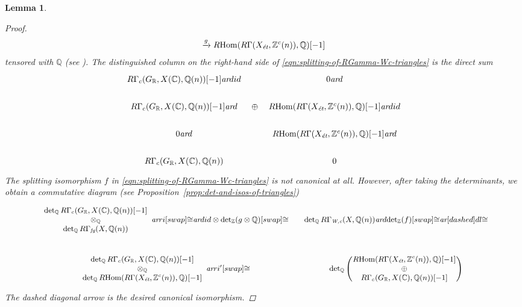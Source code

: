 \documentclass[10pt,a4paper,oneside,draft]{article}
\DeclareMathOperator{\Hom}{Hom}
\newcommand{\CC}{\mathbb{C}}
\newcommand{\QQ}{\mathbb{Q}}
\newcommand{\RR}{\mathbb{R}}
\newcommand{\ZZ}{\mathbb{Z}}
\renewcommand{\det}{\operatorname{det}}
\newcommand{\ar}{\text{\it ar}}
\newcommand{\et}{\text{\it \'{e}t}}
\newcommand{\fg}{\text{\it fg}}
\newcommand{\Wc}{\text{\it W,c}}
\newcommand{\RHom}{R\!\Hom}
\theoremstyle{myplain}
\newtheorem{lemma}[theorem]{Lemma}
\theoremstyle{mydefinition}
\numberwithin{equation}{section}
\begin{document}
\begin{lemma}
\begin{proof}
\begin{multline*}
      \xrightarrow{g} \RHom (R\Gamma (X_\et, \ZZ^c (n)), \QQ) [-1]
    \end{multline*}
    tensored with $\QQ$ (see \cite[Proposition~5.7]{Beshenov-Weil-etale-1}).
    The distinguished column on the right-hand side of
    \eqref{eqn:splitting-of-RGamma-Wc-triangles} is the direct sum
    \[ \begin{tikzcd}[row sep=1.5em]
        R\Gamma_c (G_\RR, X (\CC), \QQ (n)) [-1]\ar{d}{id} &[-2em] &[-2em] 0\ar{d} \\
        R\Gamma_c (G_\RR, X (\CC), \QQ (n)) [-1]\ar{d} & \oplus & \RHom (R\Gamma (X_\et, \ZZ^c (n)), \QQ) [-1]\ar{d}{id} \\
        0 \ar{d} & & \RHom (R\Gamma (X_\et, \ZZ^c (n)), \QQ) [-1] \ar{d} \\
        R\Gamma_c (G_\RR, X (\CC), \QQ (n)) & & 0
      \end{tikzcd} \]
    The splitting isomorphism $f$ in
    \eqref{eqn:splitting-of-RGamma-Wc-triangles} is not canonical at
    all. However, after taking the determinants, we obtain a commutative diagram
    (see Proposition~\ref{prop:det-and-isos-of-triangles})
    \[ \begin{tikzcd}[column sep=1em, font=\small]
        \begin{array}{c} \det_\QQ R\Gamma_c (G_\RR, X (\CC), \QQ (n)) [-1] \\ \otimes_\QQ \\ \det_\QQ R\Gamma_\fg (X, \QQ(n)) \end{array} \ar{r}{i}[swap]{\cong} \ar{d}{id \otimes \det_\ZZ (g\otimes \QQ)}[swap]{\cong} & \det_\QQ R\Gamma_\Wc (X, \QQ(n)) \ar{d}{\det_\ZZ (f)}[swap]{\cong}\ar[dashed]{dl}{\cong} \\
        \begin{array}{c} \det_\QQ R\Gamma_c (G_\RR, X (\CC), \QQ (n)) [-1] \\ \otimes_\QQ \\ \det_\QQ \RHom (R\Gamma (X_\et, \ZZ^c (n)), \QQ) [-1] \end{array} \ar{r}{i'}[swap]{\cong} & \det_\QQ \left(\!\!\!\begin{array}{c} \RHom (R\Gamma (X_\et, \ZZ^c (n)), \QQ) [-1] \\ \oplus \\ R\Gamma_c (G_\RR, X (\CC), \QQ (n)) [-1] \end{array}\!\!\!\right)
      \end{tikzcd} \]
    The dashed diagonal arrow is the desired canonical isomorphism.
  \end{proof}
\end{lemma}
\end{document}
